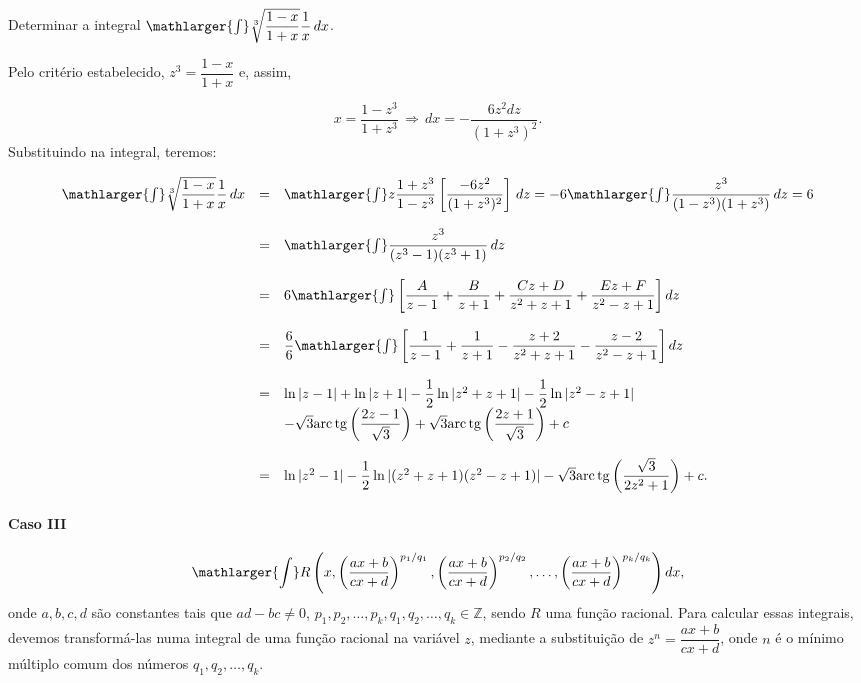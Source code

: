 \cleardoublepage\documentclass[../main.tex]{subfiles}
\begin{document}
\begin{ex}
Determinar a integral \(\mathlarger{\int} \sqrt[3]{\dfrac{1-x}{1+x}}\dfrac{1}{x}\,dx\).

\begin{solution}
Pelo critério estabelecido, \(z^3= \dfrac{1-x}{1+x}\) e, assim,

\[ x=\dfrac{1-z^3}{1+z^3}\,\Rightarrow\,dx=-\dfrac{6z^{2}dz}{(1+z^3)^2}. \]
Substituindo na integral, teremos:

\[ \begin{array}{rcl} \mathlarger{\int} \sqrt[3]{\dfrac{1-x}{1+x}}\dfrac{1}{x}\,dx &=& \mathlarger{\int} z\dfrac{1+z^3}{1-z^3}\left[\dfrac{-6z^2}{(1+z^3)^2}\right]\,dz = -6 \mathlarger{\int} \dfrac{z^3}{(1-z^3)(1+z^3)}\,dz = 6\\ \\ &=& \mathlarger{\int} \dfrac{z^3}{(z^3-1)(z^3+1)}\,dz\\ \\ &=& 6 \mathlarger{\int} \left[\dfrac{A}{z-1}+\dfrac{B}{z+1} + \dfrac{Cz+D}{z^2+z+1} +\dfrac{Ez+F}{z^2-z+1} \right] dz\\ \\ &=& \dfrac{6}{6}\mathlarger{\int} \left[\dfrac{1}{z-1}+\dfrac{1}{z+1} - \dfrac{z+2}{z^2+z+1} -\dfrac{z-2}{z^2-z+1} \right] dz\\ \\ &=& \ln|z-1|+\ln|z+1| - \dfrac{1}{2}\ln|z^2+z+1| - \dfrac{1}{2}\ln|z^2-z+1|\\ && -\sqrt{3}{\rm arc\,tg} \left(\dfrac{2z-1}{\sqrt{3}} \right) +\sqrt{3}{\rm arc\,tg} \left(\dfrac{2z+1}{\sqrt{3}} \right)+c\\ \\ &=& \ln|z^2-1|-\dfrac{1}{2} \ln|(z^2+z+1)(z^2-z+1)|-\sqrt{3}{\rm arc\,tg} \left(\dfrac{\sqrt{3}}{2z^2+1} \right)+c. \end{array} \]
\end{solution}
\end{ex}

\paragraph*{Caso III}
\[ \mathlarger{\int} R\left(x, \left(\dfrac{ax+b}{cx+d}\right)^{p_1/q_1},\left(\dfrac{ax+b}{cx+d}\right)^{p_2/q_2}, \ldots,\left(\dfrac{ax+b}{cx+d}\right)^{p_k/q_k} \right)dx, \]
onde \(a,b,c,d\) são constantes tais que \(ad-bc\neq 0\), \(p_1,p_2,\ldots,p_k,q_1,q_2,\ldots,q_k\in \mathbb{Z}\), sendo \(R\) uma função racional. Para calcular essas integrais, devemos transformá-las numa integral de uma função racional na variável \(z\), mediante a substituição de \(z^n=\dfrac{ax+b}{cx+d}\), onde \(n\) é o mínimo múltiplo comum dos números \(q_1,q_2,\ldots,q_k\).
\end{document}
